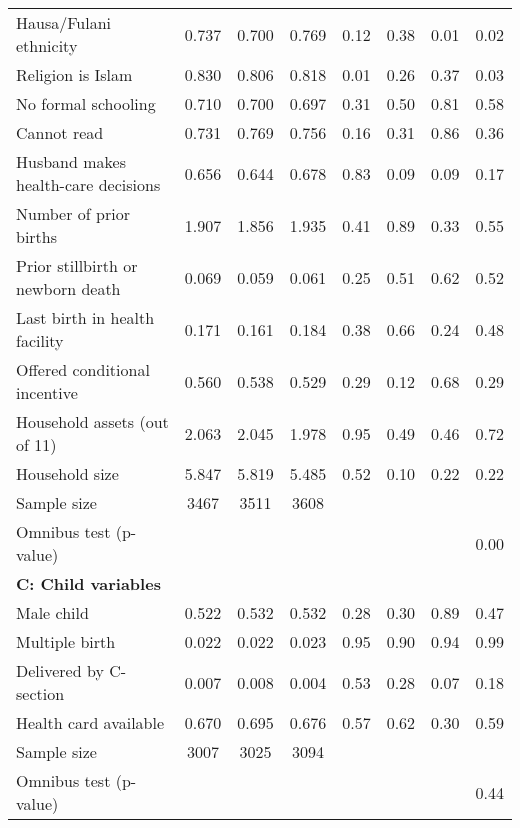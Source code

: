 \begin{tabular}{lccccccc}
Hausa/Fulani ethnicity & 0.737 & 0.700 & 0.769 & 0.12 & 0.38 & 0.01 & 0.02\\
Religion is Islam & 0.830 & 0.806 & 0.818 & 0.01 & 0.26 & 0.37 & 0.03\\
No formal schooling & 0.710 & 0.700 & 0.697 & 0.31 & 0.50 & 0.81 & 0.58\\
Cannot read & 0.731 & 0.769 & 0.756 & 0.16 & 0.31 & 0.86 & 0.36\\
Husband makes health-care decisions & 0.656 & 0.644 & 0.678 & 0.83 & 0.09 & 0.09 & 0.17\\
Number of prior births & 1.907 & 1.856 & 1.935 & 0.41 & 0.89 & 0.33 & 0.55\\
Prior stillbirth or newborn death & 0.069 & 0.059 & 0.061 & 0.25 & 0.51 & 0.62 & 0.52\\
Last birth in health facility & 0.171 & 0.161 & 0.184 & 0.38 & 0.66 & 0.24 & 0.48\\
Offered conditional incentive & 0.560 & 0.538 & 0.529 & 0.29 & 0.12 & 0.68 & 0.29\\
Household assets (out of 11) & 2.063 & 2.045 & 1.978 & 0.95 & 0.49 & 0.46 & 0.72\\
Household size & 5.847 & 5.819 & 5.485 & 0.52 & 0.10 & 0.22 & 0.22\\
Sample size & 3467 & 3511 & 3608 & & & & \\
Omnibus test (p-value) & & & & & & & 0.00 \\
\midrule
\multicolumn{8}{p{0.99\textwidth}}{\textbf{C: Child variables}} \\ 
Male child & 0.522 & 0.532 & 0.532 & 0.28 & 0.30 & 0.89 & 0.47\\
Multiple birth & 0.022 & 0.022 & 0.023 & 0.95 & 0.90 & 0.94 & 0.99\\
Delivered by C-section & 0.007 & 0.008 & 0.004 & 0.53 & 0.28 & 0.07 & 0.18\\
Health card available & 0.670 & 0.695 & 0.676 & 0.57 & 0.62 & 0.30 & 0.59\\
Sample size & 3007 & 3025 & 3094 & & & & \\
Omnibus test (p-value) & & & & & & & 0.44 \\
\midrule
\bottomrule
\end{tabular}
